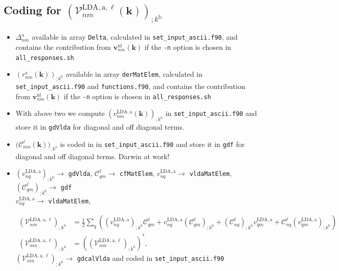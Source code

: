 \subsection{Coding for \texorpdfstring{$(\mathcal{V}^{\mathrm{LDA},\mathrm{a},\ell}_{nm}(\mathbf{k}))_{;k^\mathrm{b}}$}{(Vnm);k}}
\begin{itemize}
\item $\Delta^\mathrm{a}_{nm}$ available in array \verb=Delta=, 
calculated in \verb=set_input_ascii.f90=,
 and contains the
  contribution from $\mathbf{v}^\mathrm{nl}_{nm}(\mathbf{k})$ if the \verb=-n= option is
  chosen in \verb=all_responses.sh= 
\item $(r^\mathrm{a}_{nm}(\mathbf{k}))_{;k^\mathrm{b}}$
 available in array
  \verb=derMatElem=,
calculated in \verb=set_input_ascii.f90= and \verb=functions.f90=,
 and contains the
  contribution from $\mathbf{v}^\mathrm{nl}_{nm}(\mathbf{k})$ if the \verb=-n= option is
  chosen in \verb=all_responses.sh= 
\item With above two we compute $(v^{\mathrm{LDA},\mathrm{a}}_{nm}(\mathbf{k}))_{;k^\mathrm{b}}$ 
in \verb=set_input_ascii.f90=  and store it in \verb=gdVlda= for
diagonal and off diagonal terms.
\item $\big(\mathcal{C}^\ell_{nm}(\mathbf{k})\big)_{;k^\mathrm{a}}$ is coded in 
in \verb=set_input_ascii.f90=  and store it in \verb=gdf= for
diagonal and off diagonal terms. Darwin at work!
\item $(v^{\mathrm{LDA},\mathrm{a}}_{nq})_{;k^\mathrm{b}}\to$ \verb=gdVlda=,
  $\mathcal{C}^\ell_{qm}\to$ \verb=cfMatElem=,
$v^{\mathrm{LDA},\mathrm{a}}_{nq}\to$ \verb=vldaMatElem=, 
$(\mathcal{C}^\ell_{qm})_{;k^\mathrm{b}}\to$
\verb=gdf=\\
 $v^{\mathrm{LDA},\mathrm{a}}_{nq}\to$ \verb=vldaMatElem=,

 \begin{align}\label{c-a.2nn}
\left(\mathcal{V}^{\mathrm{LDA},\mathrm{a},\ell}_{nm}\right)_{;k^\mathrm{b}}
&=
\frac{1}{2}\sum_q\left(
(v^{\mathrm{LDA},\mathrm{a}}_{nq})_{;k^\mathrm{b}}\mathcal{C}^\ell_{qm}
+ 
v^{\mathrm{LDA},\mathrm{a}}_{nq}(\mathcal{C}^\ell_{qm})_{;k^\mathrm{b}}
+
(\mathcal{C}^\ell_{nq})_{;k^\mathrm{b}} v^{\mathrm{LDA},\mathrm{a}}_{qm}
+
\mathcal{C}^\ell_{nq} (v^{\mathrm{LDA},\mathrm{a}}_{qm})_{;k^\mathrm{b}}
\right)
\nonumber\\
\left(\mathcal{V}^{\mathrm{LDA},\mathrm{a},\ell}_{mn}\right)_{;k^\mathrm{b}}&=\left(\left(\mathcal{V}^{\mathrm{LDA},\mathrm{a},\ell}_{nm}\right)_{;k^\mathrm{b}}\right)^*
,
\end{align} 
$\left(\mathcal{V}^{\mathrm{LDA},\mathrm{a},\ell}_{nm}\right)_{;k^\mathrm{b}}\to$
\verb=gdcalVlda= and coded in \verb=set_input_ascii.f90=
\end{itemize}


